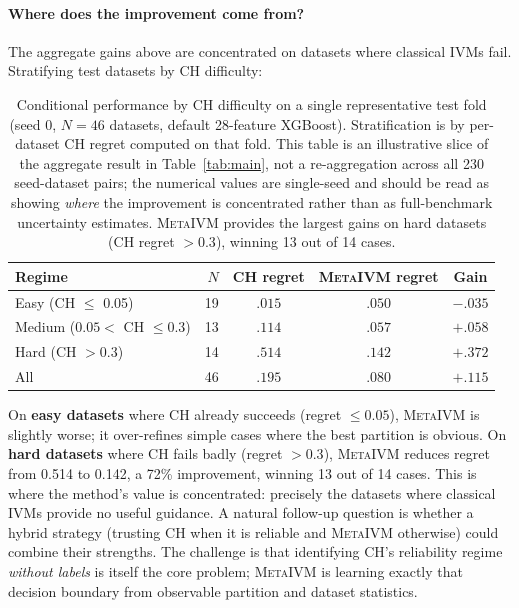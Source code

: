 \documentclass[10pt]{article} %
\newcommand{\ours}{\textsc{MetaIVM}}
\begin{document}
\paragraph{Where does the improvement come from?} The aggregate gains above are concentrated on datasets where classical IVMs fail. Stratifying test datasets by CH difficulty:

\begin{table}[t]
\centering
\caption{Conditional performance by CH difficulty on a single representative test fold (seed 0, $N = 46$ datasets, default 28-feature XGBoost). Stratification is by per-dataset CH regret computed on that fold. This table is an illustrative slice of the aggregate result in Table~\ref{tab:main}, not a re-aggregation across all 230 seed-dataset pairs; the numerical values are single-seed and should be read as showing \emph{where} the improvement is concentrated rather than as full-benchmark uncertainty estimates. \ours{} provides the largest gains on hard datasets (CH regret $> 0.3$), winning 13 out of 14 cases.}
\label{tab:conditional}
\small
\begin{tabular}{lrccc}
\toprule
\textbf{Regime} & $N$ & \textbf{CH regret} & \textbf{\ours{} regret} & \textbf{Gain} \\
\midrule
Easy (CH $\leq$ 0.05) & 19 & $.015$ & $.050$ & $-.035$ \\
Medium ($0.05 <$ CH $\leq 0.3$) & 13 & $.114$ & $.057$ & $+.058$ \\
Hard (CH $> 0.3$) & 14 & $.514$ & $.142$ & $+.372$ \\
\midrule
All & 46 & $.195$ & $.080$ & $+.115$ \\
\bottomrule
\end{tabular}
\end{table}

On \textbf{easy datasets} where CH already succeeds (regret $\leq 0.05$), \ours{} is slightly worse; it over-refines simple cases where the best partition is obvious. On \textbf{hard datasets} where CH fails badly (regret $> 0.3$), \ours{} reduces regret from 0.514 to 0.142, a 72\% improvement, winning 13 out of 14 cases. This is where the method's value is concentrated: precisely the datasets where classical IVMs provide no useful guidance. A natural follow-up question is whether a hybrid strategy (trusting CH when it is reliable and \ours{} otherwise) could combine their strengths. The challenge is that identifying CH's reliability regime \emph{without labels} is itself the core problem; \ours{} is learning exactly that decision boundary from observable partition and dataset statistics.
\end{document}
